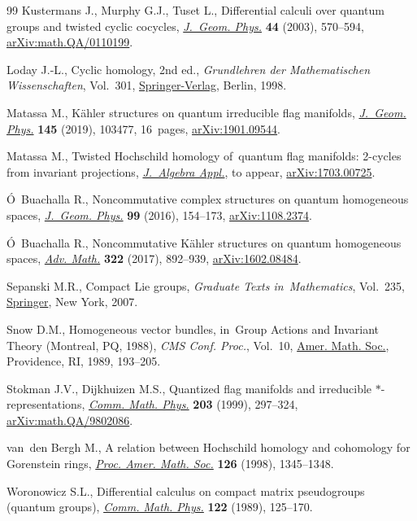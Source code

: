 \begin{thebibliography}{99}
Kustermans J., Murphy G.J., Tuset L., Differential calculi over quantum groups
 and twisted cyclic cocycles, \href{https://doi.org/10.1016/S0393-0440(02)00115-8}{\textit{J.~Geom. Phys.}} \textbf{44} (2003),
 570--594, \href{https://arxiv.org/abs/math.QA/0110199}{arXiv:math.QA/0110199}.

Loday J.-L., Cyclic homology, 2nd ed., \textit{Grundlehren der Mathematischen
 Wissenschaften}, Vol.~301, \href{https://doi.org/10.1007/978-3-662-11389-9}{Springer-Verlag}, Berlin, 1998.

Matassa M., K\"ahler structures on quantum irreducible flag manifolds,
 \href{https://doi.org/10.1016/j.geomphys.2019.07.008}{\textit{J.~Geom. Phys.}} \textbf{145} (2019), 103477, 16~pages,
 \href{https://arxiv.org/abs/1901.09544}{arXiv:1901.09544}.

Matassa M., Twisted Hoch\-schild homology of~quantum flag manifolds: 2-cycles
 from invariant projections, \href{http://dx.doi.org/10.1142/S0219498804000940}{\textit{J.~Algebra Appl.}}, {t}o appear,
 \href{https://arxiv.org/abs/1703.00725}{arXiv:1703.00725}.

\'O~Buachalla R., Noncommutative complex structures on quantum homogeneous
 spaces, \href{https://doi.org/10.1016/j.geomphys.2015.10.003}{\textit{J.~Geom. Phys.}} \textbf{99} (2016), 154--173,
 \href{https://arxiv.org/abs/1108.2374}{arXiv:1108.2374}.

\'O~Buachalla R., Noncommutative {K}\"ahler structures on quantum homogeneous
 spaces, \href{https://doi.org/10.1016/j.aim.2017.09.031}{\textit{Adv. Math.}} \textbf{322} (2017), 892--939,
 \href{https://arxiv.org/abs/1602.08484}{arXiv:1602.08484}.

Sepanski M.R., Compact {L}ie groups, \textit{Graduate Texts in~Mathematics},
 Vol.~235, \href{https://doi.org/10.1007/978-0-387-49158-5}{Springer}, New York, 2007.

Snow D.M., Homogeneous vector bundles, in~Group Actions and Invariant Theory
 ({M}ontreal, {PQ}, 1988), \textit{CMS Conf. Proc.}, Vol.~10, \href{https://doi.org/10.1007/bf02564684}{Amer. Math.
 Soc.}, Providence, RI, 1989, 193--205.

Stokman J.V., Dijkhuizen M.S., Quantized flag manifolds and irreducible
 {$*$}-representations, \href{https://doi.org/10.1007/s002200050613}{\textit{Comm. Math. Phys.}} \textbf{203} (1999),
 297--324, \href{https://arxiv.org/abs/math.QA/9802086}{arXiv:math.QA/9802086}.

van~den Bergh M., A relation between {H}ochschild homology and cohomology for
 {G}orenstein rings, \href{https://doi.org/10.1090/S0002-9939-98-04210-5}{\textit{Proc. Amer. Math. Soc.}} \textbf{126} (1998),
 1345--1348.

Woronowicz S.L., Differential calculus on compact matrix pseudogroups (quantum
 groups), \href{https://doi.org/10.1007/BF01221411}{\textit{Comm. Math. Phys.}} \textbf{122} (1989), 125--170.

\end{thebibliography}
